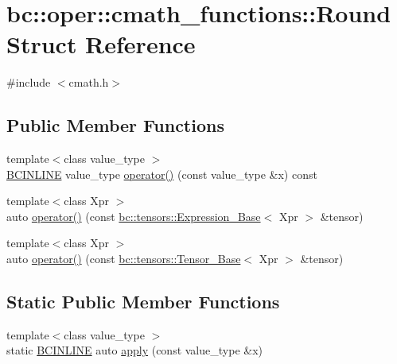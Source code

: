 \hypertarget{structbc_1_1oper_1_1cmath__functions_1_1Round}{}\section{bc\+:\+:oper\+:\+:cmath\+\_\+functions\+:\+:Round Struct Reference}
\label{structbc_1_1oper_1_1cmath__functions_1_1Round}


{\ttfamily \#include $<$cmath.\+h$>$}

\subsection*{Public Member Functions}
\begin{DoxyCompactItemize}
\item 
{\footnotesize template$<$class value\+\_\+type $>$ }\\\hyperlink{common_8h_a6699e8b0449da5c0fafb878e59c1d4b1}{B\+C\+I\+N\+L\+I\+NE} value\+\_\+type \hyperlink{structbc_1_1oper_1_1cmath__functions_1_1Round_aa18b888f206639ede574b6707188f85a}{operator()} (const value\+\_\+type \&x) const
\item 
{\footnotesize template$<$class Xpr $>$ }\\auto \hyperlink{structbc_1_1oper_1_1cmath__functions_1_1Round_ab2696f8d599070a885c91740925331ce}{operator()} (const \hyperlink{classbc_1_1tensors_1_1Expression__Base}{bc\+::tensors\+::\+Expression\+\_\+\+Base}$<$ Xpr $>$ \&tensor)
\item 
{\footnotesize template$<$class Xpr $>$ }\\auto \hyperlink{structbc_1_1oper_1_1cmath__functions_1_1Round_ae204a8cef526adfe4872c7f2a69e039d}{operator()} (const \hyperlink{classbc_1_1tensors_1_1Tensor__Base}{bc\+::tensors\+::\+Tensor\+\_\+\+Base}$<$ Xpr $>$ \&tensor)
\end{DoxyCompactItemize}
\subsection*{Static Public Member Functions}
\begin{DoxyCompactItemize}
\item 
{\footnotesize template$<$class value\+\_\+type $>$ }\\static \hyperlink{common_8h_a6699e8b0449da5c0fafb878e59c1d4b1}{B\+C\+I\+N\+L\+I\+NE} auto \hyperlink{structbc_1_1oper_1_1cmath__functions_1_1Round_af83dcc8329027e7abc9a831696527687}{apply} (const value\+\_\+type \&x)
\end{DoxyCompactItemize}



